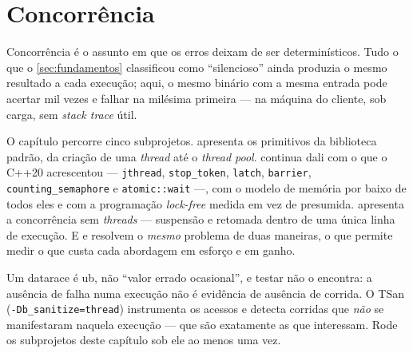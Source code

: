 
\section{Concorrência}
\label{sec:concorrencia}

Concorrência é o assunto em que os erros deixam de ser determinísticos. Tudo o
que o \cref{sec:fundamentos} classificou como ``silencioso'' ainda produzia o
mesmo resultado a cada execução; aqui, o mesmo binário com a mesma entrada pode
acertar mil vezes e falhar na milésima primeira --- na máquina do cliente, sob
carga, sem \emph{stack trace} útil.

O capítulo percorre cinco subprojetos.  apresenta os
primitivos da biblioteca padrão, da criação de uma \emph{thread} até o
\emph{thread pool}.  continua dali com o que o C++20
acrescentou --- \texttt{jthread}, \texttt{stop\_token}, \texttt{latch},
\texttt{barrier}, \texttt{counting\_semaphore} e \texttt{atomic::wait} ---, com
o modelo de memória por baixo de todos eles e com a programação
\emph{lock-free} medida em vez de presumida.  apresenta a
concorrência sem \emph{threads} --- suspensão e retomada dentro de uma única
linha de execução. E  e 
resolvem o \emph{mesmo} problema de duas maneiras, o que permite medir o que
custa cada abordagem em esforço e em ganho.

\begin{regra}
Um \gls{datarace} é \gls{ub}, não ``valor errado ocasional'', e testar não o
encontra: a ausência de falha numa execução não é evidência de ausência de
corrida. O TSan (\texttt{-Db\_sanitize=thread}) instrumenta os acessos e detecta
corridas que \emph{não} se manifestaram naquela execução --- que são exatamente
as que interessam. Rode os subprojetos deste capítulo sob ele ao menos uma vez.
\end{regra}


